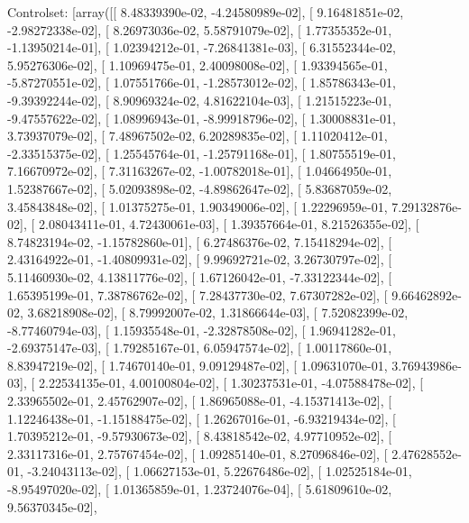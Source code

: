 \documentclass{article}
\begin{document}
Controlset: [array([[  8.48339390e-02,  -4.24580989e-02],
       [  9.16481851e-02,  -2.98272338e-02],
       [  8.26973036e-02,   5.58791079e-02],
       [  1.77355352e-01,  -1.13950214e-01],
       [  1.02394212e-01,  -7.26841381e-03],
       [  6.31552344e-02,   5.95276306e-02],
       [  1.10969475e-01,   2.40098008e-02],
       [  1.93394565e-01,  -5.87270551e-02],
       [  1.07551766e-01,  -1.28573012e-02],
       [  1.85786343e-01,  -9.39392244e-02],
       [  8.90969324e-02,   4.81622104e-03],
       [  1.21515223e-01,  -9.47557622e-02],
       [  1.08996943e-01,  -8.99918796e-02],
       [  1.30008831e-01,   3.73937079e-02],
       [  7.48967502e-02,   6.20289835e-02],
       [  1.11020412e-01,  -2.33515375e-02],
       [  1.25545764e-01,  -1.25791168e-01],
       [  1.80755519e-01,   7.16670972e-02],
       [  7.31163267e-02,  -1.00782018e-01],
       [  1.04664950e-01,   1.52387667e-02],
       [  5.02093898e-02,  -4.89862647e-02],
       [  5.83687059e-02,   3.45843848e-02],
       [  1.01375275e-01,   1.90349006e-02],
       [  1.22296959e-01,   7.29132876e-02],
       [  2.08043411e-01,   4.72430061e-03],
       [  1.39357664e-01,   8.21526355e-02],
       [  8.74823194e-02,  -1.15782860e-01],
       [  6.27486376e-02,   7.15418294e-02],
       [  2.43164922e-01,  -1.40809931e-02],
       [  9.99692721e-02,   3.26730797e-02],
       [  5.11460930e-02,   4.13811776e-02],
       [  1.67126042e-01,  -7.33122344e-02],
       [  1.65395199e-01,   7.38786762e-02],
       [  7.28437730e-02,   7.67307282e-02],
       [  9.66462892e-02,   3.68218908e-02],
       [  8.79992007e-02,   1.31866644e-03],
       [  7.52082399e-02,  -8.77460794e-03],
       [  1.15935548e-01,  -2.32878508e-02],
       [  1.96941282e-01,  -2.69375147e-03],
       [  1.79285167e-01,   6.05947574e-02],
       [  1.00117860e-01,   8.83947219e-02],
       [  1.74670140e-01,   9.09129487e-02],
       [  1.09631070e-01,   3.76943986e-03],
       [  2.22534135e-01,   4.00100804e-02],
       [  1.30237531e-01,  -4.07588478e-02],
       [  2.33965502e-01,   2.45762907e-02],
       [  1.86965088e-01,  -4.15371413e-02],
       [  1.12246438e-01,  -1.15188475e-02],
       [  1.26267016e-01,  -6.93219434e-02],
       [  1.70395212e-01,  -9.57930673e-02],
       [  8.43818542e-02,   4.97710952e-02],
       [  2.33117316e-01,   2.75767454e-02],
       [  1.09285140e-01,   8.27096846e-02],
       [  2.47628552e-01,  -3.24043113e-02],
       [  1.06627153e-01,   5.22676486e-02],
       [  1.02525184e-01,  -8.95497020e-02],
       [  1.01365859e-01,   1.23724076e-04],
       [  5.61809610e-02,   9.56370345e-02],
\end{document}
